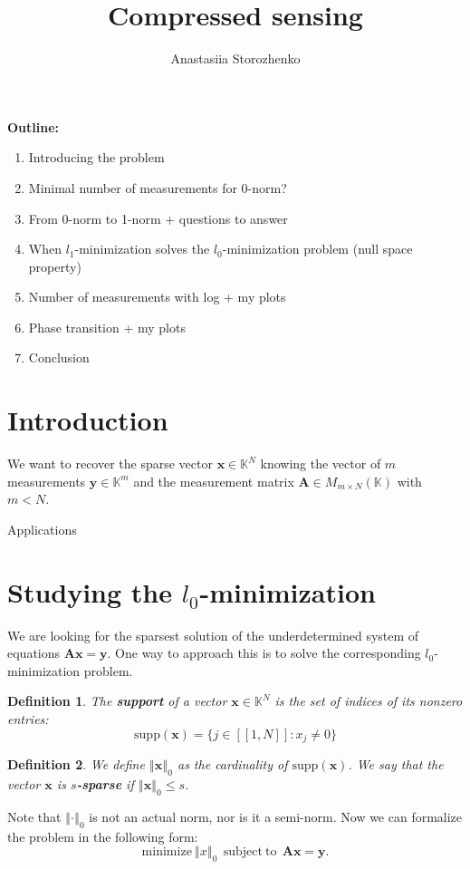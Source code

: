 \documentclass[11pt]{article}
\title{Compressed sensing}
\author{Anastasiia Storozhenko}
\newtheorem{definition}{Definition}[section]
\newcommand{\norm}[1]{\left\Vert#1\right\Vert}
\begin{document}
\maketitle

\textbf{Outline:}

\begin{enumerate}
    \item Introducing the problem
    \item Minimal number of measurements for 0-norm?
    \item From 0-norm to 1-norm + questions to answer
    \item When $l_1$-minimization solves the $l_0$-minimization problem (null space property)
    \item Number of measurements with log + my plots
    \item Phase transition + my plots
    \item Conclusion
\end{enumerate}

\section{Introduction}
We want to recover the sparse vector $\mathbf{x} \in \mathbb{K}^N$ knowing the vector of $m$ measurements $\mathbf{y} \in \mathbb{K}^m$ and the measurement matrix $\mathbf{A} \in M_{m \times N}(\mathbb{K})$ with $m < N$.

Applications

\section{Studying the $l_0$-minimization}

We are looking for the sparsest solution of the underdetermined system of equations $\mathbf{Ax=y}$.
One way to approach this is to solve the corresponding $l_0$-minimization problem.

\begin{definition}
    The \textbf{support} of a vector $\mathbf{x} \in \mathbb{K}^N$ is the set of indices of its nonzero entries:
    \begin{equation*}
        \mathrm{supp}(\mathbf{x}) = \{ j \in [\![1,N]\!] \colon x_j \neq 0 \}
    \end{equation*}
\end{definition}

\begin{definition}
    We define $\norm{\mathbf{x}}_0$ as the cardinality of $\mathrm{supp}(\mathbf{x})$.
    We say that the vector $\mathbf{x}$ is \textbf{$s$-sparse} if $\norm{\mathbf{x}}_0 \leq s$.
\end{definition}
Note that $\norm{\cdot}_0$ is not an actual norm, nor is it a semi-norm.
Now we can formalize the problem in the following form:
\begin{equation}\label{eq:l0}
    \mathrm{minimize} \ \norm{x}_0 \ \ \mathrm{subject\ to} \ \ \mathbf{Ax=y}. \tag{P_0}
\end{equation}
\end{document}
